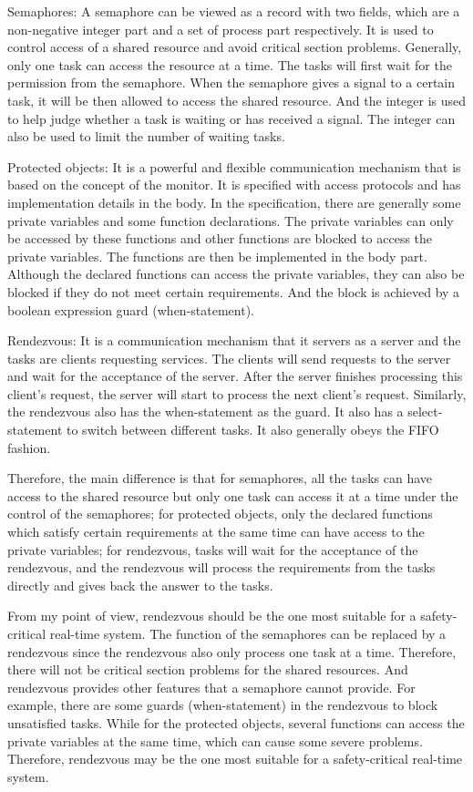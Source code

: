\documentclass[10pt]{article}
\begin{document}
Semaphores: A semaphore can be viewed as a record with two fields, which are a non-negative integer part and a set of process part respectively. It is used to control access of a shared resource and avoid critical section problems. Generally, only one task can access the resource at a time. The tasks will first wait for the permission from the semaphore. When the semaphore gives a signal to a certain task, it will be then allowed to access the shared resource. And the integer is used to help judge whether a task is waiting or has received a signal. The integer can also be used to limit the number of waiting tasks.

Protected objects: It is a powerful and flexible communication mechanism that is based on the concept of the monitor. It is specified with access protocols and has implementation details in the body. In the specification, there are generally some private variables and some function declarations. The private variables can only be accessed by these functions and other functions are blocked to access the private variables. The functions are then be implemented in the body part. Although the declared functions can access the private variables, they can also be blocked if they do not meet certain requirements. And the block is achieved by a boolean expression guard (when-statement).

Rendezvous: It is a communication mechanism that it servers as a server and the tasks are clients requesting services. The clients will send requests to the server and wait for the acceptance of the server. After the server finishes processing this client's request, the server will start to process the next client's request. Similarly, the rendezvous also has the when-statement as the guard. It also has a select-statement to switch between different tasks. It also generally obeys the FIFO fashion.

Therefore, the main difference is that for semaphores, all the tasks can have access to the shared resource but only one task can access it at a time under the control of the semaphores; for protected objects, only the declared functions which satisfy certain requirements at the same time can have access to the private variables; for rendezvous, tasks will wait for the acceptance of the rendezvous, and the rendezvous will process the requirements from the tasks directly and gives back the answer to the tasks.

From my point of view, rendezvous should be the one most suitable for a safety-critical real-time system. The function of the semaphores can be replaced by a rendezvous since the rendezvous also only process one task at a time. Therefore, there will not be critical section problems for the shared resources. And rendezvous provides other features that a semaphore cannot provide. For example, there are some guards (when-statement) in the rendezvous to block unsatisfied tasks. While for the protected objects, several functions can access the private variables at the same time, which can cause some severe problems. Therefore, rendezvous may be the one most suitable for a safety-critical real-time system.
\end{document}
